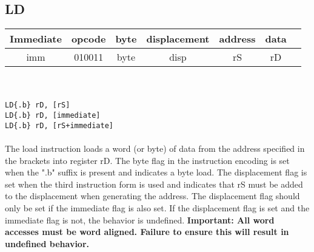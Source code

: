 \documentclass{article}
\begin{document}
        \subsection{LD}
        \begin{tabular}{|c | c | c | c | c | c | c |}
        \hline
        Immediate & opcode & byte & displacement & address & data \\ \hline
        imm & 010011 & byte & disp & rS & rD \\ \hline
        \end{tabular}\noindent \\ \\
        \texttt{LD\{.b\} rD, [rS] \\ LD\{.b\} rD, [immediate] \\ LD\{.b\} rD, [rS+immediate]\\ \\}
        The load instruction loads a word (or byte) of data from the address specified in the brackets into register rD. The byte flag in the instruction encoding is set when the ".b" suffix is present and indicates a byte load. The displacement flag is set when the third instruction form is used and indicates that rS must be added to the displacement when generating the address. The displacement flag should only be set if the immediate flag is also set. If the displacement flag is set and the immediate flag is not, the behavior is undefined. \textbf{Important: All word accesses must be word aligned. Failure to ensure this will result in undefined behavior. }
\end{document}
